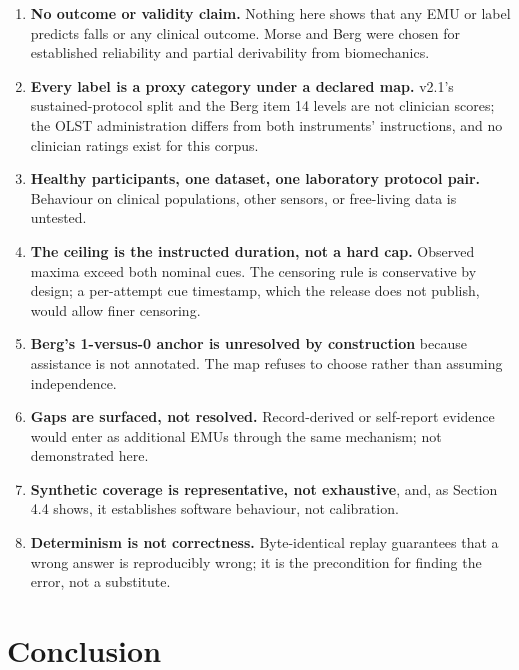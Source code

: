 \documentclass[11pt]{article}
\providecommand{\tightlist}{\setlength{\itemsep}{0pt}\setlength{\parskip}{0pt}}
\begin{document}
\begin{enumerate}
\def\labelenumi{\arabic{enumi}.}
\tightlist
\item
  \textbf{No outcome or validity claim.} Nothing here shows that any EMU or label predicts falls or any clinical outcome. Morse and Berg were chosen for established reliability and partial derivability from biomechanics.
\item
  \textbf{Every label is a proxy category under a declared map.} v2.1's sustained-protocol split and the Berg item 14 levels are not clinician scores; the OLST administration differs from both instruments' instructions, and no clinician ratings exist for this corpus.
\item
  \textbf{Healthy participants, one dataset, one laboratory protocol pair.} Behaviour on clinical populations, other sensors, or free-living data is untested.
\item
  \textbf{The ceiling is the instructed duration, not a hard cap.} Observed maxima exceed both nominal cues. The censoring rule is conservative by design; a per-attempt cue timestamp, which the release does not publish, would allow finer censoring.
\item
  \textbf{Berg's 1-versus-0 anchor is unresolved by construction} because assistance is not annotated. The map refuses to choose rather than assuming independence.
\item
  \textbf{Gaps are surfaced, not resolved.} Record-derived or self-report evidence would enter as additional EMUs through the same mechanism; not demonstrated here.
\item
  \textbf{Synthetic coverage is representative, not exhaustive}, and, as Section 4.4 shows, it establishes software behaviour, not calibration.
\item
  \textbf{Determinism is not correctness.} Byte-identical replay guarantees that a wrong answer is reproducibly wrong; it is the precondition for finding the error, not a substitute.
\end{enumerate}

\section{Conclusion}\label{conclusion}
\end{document}
